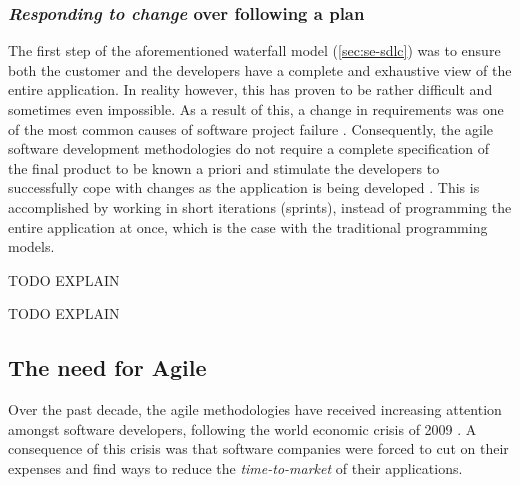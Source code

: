 \subsubsection{\emph{Responding to change} over following a plan}
The first step of the aforementioned waterfall model (\autoref{sec:se-sdlc}) was to ensure both the customer and the developers have a complete and exhaustive view of the entire application. In reality however, this has proven to be rather difficult and sometimes even impossible. As a result of this, a change in requirements was one of the most common causes of software project failure \cite{glass2001agile}. Consequently, the agile software development methodologies do not require a complete specification of the final product to be known a priori and stimulate the developers to successfully cope with changes as the application is being developed \cite{Hazzan2014}. This is accomplished by working in short iterations (sprints), instead of programming the entire application at once, which is the case with the traditional programming models.

TODO EXPLAIN

TODO EXPLAIN



\subsection{The need for Agile}
Over the past decade, the agile methodologies have received increasing attention amongst software developers, following the world economic crisis of 2009 \cite{ionel2009}. A consequence of this crisis was that software companies were forced to cut on their expenses and find ways to reduce the \emph{time-to-market} of their applications.



